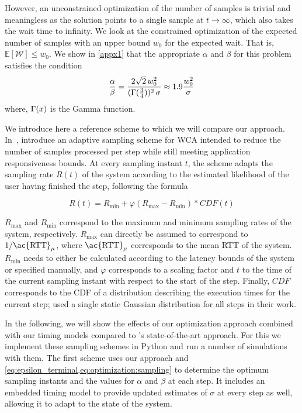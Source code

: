 However, an unconstrained optimization of the number of samples is trivial and meaningless as the solution points to a single sample at $t\!\rightarrow\!\infty$, which also takes the wait time to infinity.
We look at the constrained optimization of the expected number of samples with an upper bound $w_0$ for the expected wait.
That is, $\mathbb{E}[\mathcal{W}]\!\leq\!w_0$. We show in \cref{appx1} that the appropriate $\alpha$ and $\beta$ for this problem satisfies the condition
\begin{alignat}{1}\label{eq:optimization:sampling}
\frac{\alpha}{\beta}=\frac{2\sqrt{2}\,w_0^2}{(\mathlarger{\Gamma}(\tfrac{3}{4}))^2\,\sigma}\approx1.9\frac{w_0^2}{\sigma}
\end{alignat}
where, $\mathlarger{\Gamma}(x)$ is the Gamma function.

\medskip

We introduce here a reference scheme to which we will compare our approach.
In~\cite{Wang2019Towards}, \citeauthor{Wang2019Towards} introduce an adaptive sampling scheme for \ac{WCA} intended to reduce the number of samples processed per step while still meeting application responsiveness bounds.
At every sampling instant \( t \), the scheme adapts the sampling rate \( R(t) \) of the system according to the estimated likelihood of the user having finished the step,
following the formula 

\begin{equation}
    R(t) = R_\text{min} + \varphi\left( R_\text{max} - R_\text{min} \right) * CDF(t)
\end{equation}

\( R_\text{max} \) and \( R_\text{min} \) correspond to the maximum and minimum sampling rates of the system, respectively.
\( R_\text{max} \) can directly be assumed to correspond to \( 1 / \text{\ac{RTT}}_\mu \), where \( \text{\ac{RTT}}_\mu \) corresponds to the mean \ac{RTT} of the system.
\( R_\text{min} \) needs to either be calculated according to the latency bounds of the system or specified manually, and \( \varphi \) corresponds to a scaling factor and \( t \) to the time of the current sampling instant with respect to the start of the step.
Finally, \( CDF \) corresponds to the \ac{CDF} of a distribution describing the execution times for the current step; \citeauthor{Wang2019Towards} used a single static Gaussian distribution for all steps in their work.

\medskip

In the following, we will show the effects of our optimization approach combined with our timing models compared to \textcite{Wang2019Towards}'s state-of-the-art approach.
For this we implement these sampling schemes in Python and run a number of simulations with them.
The first scheme uses our approach and \cref{eq:epsilon_terminal,eq:optimization:sampling} to determine the optimum sampling instants and the values for \( \alpha \) and \( \beta \) at each step.
It includes an embedded timing model to provide updated estimates of \( \sigma \) at every step as well, allowing it to adapt to the state of the system.

